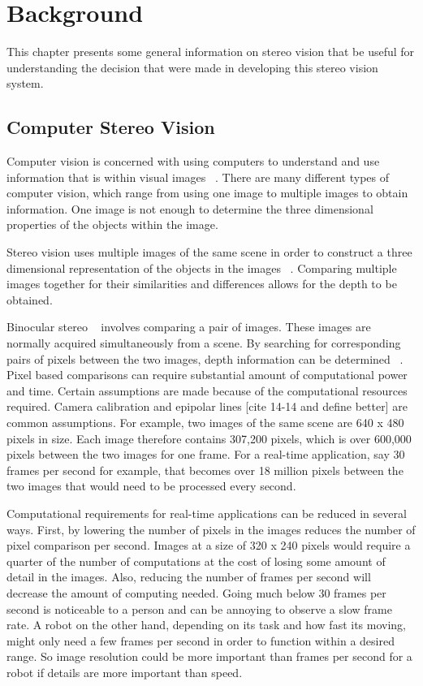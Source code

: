 \chapter{Background}
\label{bckgrnd}

This chapter presents some general information on stereo vision that be useful for understanding the decision that were made in developing this stereo vision system.

\section{Computer Stereo Vision}

Computer vision is concerned with using computers to understand and use information that is within visual images ~\cite{computerVision}. There are many different types of computer vision, which range from using one image to multiple images to obtain information. One image is not enough to determine the three dimensional properties of the objects within the image.

Stereo vision uses multiple images of the same scene in order to construct a three dimensional representation of the objects in the images ~\cite{stereoVision}. Comparing multiple images together for their similarities and differences allows for the depth to be obtained.

Binocular stereo ~\cite{binocularStereo} involves comparing a pair of images. These images are normally acquired simultaneously from a scene. By searching for corresponding pairs of pixels between the two images, depth information can be determined ~\cite{binocularStereo}. Pixel based comparisons can require substantial amount of computational power and time. Certain assumptions are made because of the computational resources required. Camera calibration and epipolar lines [cite 14-14 and define better] are common assumptions. For example, two images of the same scene are 640 x 480 pixels in size. Each image therefore contains 307,200 pixels, which is over 600,000 pixels between the two images for one frame. For a real-time application, say 30 frames per second for example, that becomes over 18 million pixels between the two images that would need to be processed every second.

Computational requirements for real-time applications can be reduced in several ways. First, by lowering the number of pixels in the images reduces the number of pixel comparison per second. Images at a size of 320 x 240 pixels would require a quarter of the number of computations at the cost of losing some amount of detail in the images. Also, reducing the number of frames per second will decrease the amount of computing needed. Going much below 30 frames per second is noticeable to a person and can be annoying to observe a slow frame rate. A robot on the other hand, depending on its task and how fast its moving, might only need a few frames per second in order to function within a desired range. So image resolution could be more important than frames per second for a robot if details are more important than speed.

